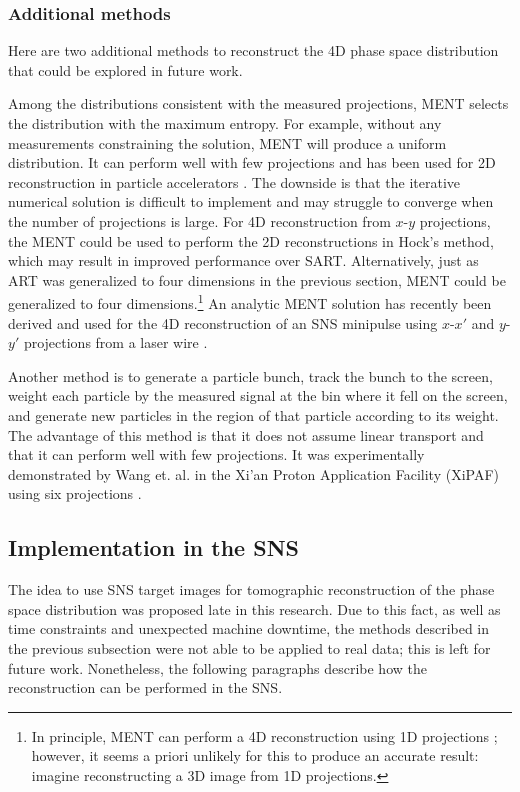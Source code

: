 \subsubsection{Additional methods}

Here are two additional methods to reconstruct the 4D phase space distribution that could be explored in future work.

Among the distributions consistent with the measured projections, MENT selects the distribution with the maximum entropy. For example, without any measurements constraining the solution, MENT will produce a uniform distribution. It can perform well with few projections and has been used for 2D reconstruction in particle accelerators \cite{Hock2013a}. The downside is that the iterative numerical solution is difficult to implement and may struggle to converge when the number of projections is large. For 4D reconstruction from $x$-$y$ projections, the MENT could be used to perform the 2D reconstructions in Hock's method, which may result in improved performance over SART. Alternatively, just as ART was generalized to four dimensions in the previous section, MENT could be generalized to four dimensions.\footnote{In principle, MENT can perform a 4D reconstruction using 1D projections \cite{Sander1979}; however, it seems a priori unlikely for this to produce an accurate result: imagine reconstructing a 3D image from 1D projections.} An analytic MENT solution has recently been derived and used for the 4D reconstruction of an SNS minipulse using $x$-$x'$ and $y$-$y'$ projections from a laser wire \cite{Wong-forthcoming}. 

Another method is to generate a particle bunch, track the bunch to the screen, weight each particle by the measured signal at the bin where it fell on the screen, and generate new particles in the region of that particle according to its weight. The advantage of this method is that it does not assume linear transport and that it can perform well with few projections. It was experimentally demonstrated by Wang et. al. in the Xi’an Proton Application Facility (XiPAF) using six projections \cite{Wang2019}. 



\subsection{Implementation in the SNS}

The idea to use SNS target images for tomographic reconstruction of the phase space distribution was proposed late in this research. Due to this fact, as well as time constraints and unexpected machine downtime, the methods described in the previous subsection were not able to be applied to real data; this is left for future work. Nonetheless, the following paragraphs describe how the reconstruction can be performed in the SNS.



